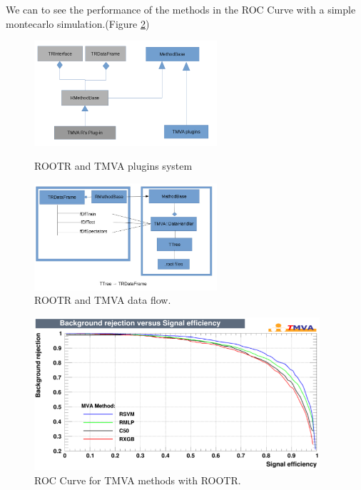 \documentclass[a4paper]{jpconf}
\begin{document}
We can to see the performance of the methods in the ROC Curve with a simple montecarlo simulation.(Figure \ref{rmvaroc})

\begin{figure}[h]
\centering
\begin{minipage}{15pc}
\includegraphics[width=16pc]{img/rmvaplugins.png}
\caption{\label{rmvaplug}ROOTR and TMVA plugins system}
\end{minipage}\hspace{2pc}%
\begin{minipage}{15pc}
\includegraphics[width=16pc]{img/rmvadf.jpg}
\caption{\label{rmvadf}ROOTR and TMVA data flow.}
\end{minipage}\hspace{2pc}%
\end{figure}

\begin{figure}[h]
\centering
\includegraphics[width=25pc]{img/rmvaroc.png}\caption{\label{rmvaroc} ROC Curve for TMVA methods with ROOTR.}
\end{figure}
\end{document}
